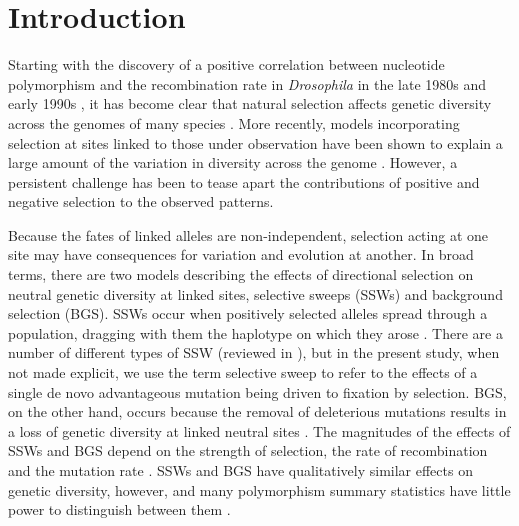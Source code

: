 \section{Introduction}
 
	Starting with the discovery of a positive correlation between nucleotide polymorphism and the recombination rate in \textit{Drosophila} in the late 1980s and early 1990s \citep{RN225, RN114}, it has become clear that natural selection affects genetic diversity across the genomes of many species \citep{RN117, RN154}. More recently, models incorporating selection at sites linked to those under observation have been shown to explain a large amount of the variation in diversity across the genome \citep{RN120, RN228, RN116, RN274}. However, a persistent challenge has been to tease apart the contributions of positive and negative selection to the observed patterns.

	Because the fates of linked alleles are non-independent, selection acting at one site may have consequences for variation and evolution at another. In broad terms, there are two models describing the effects of directional selection on neutral genetic diversity at linked sites, selective sweeps (SSWs) and background selection (BGS). SSWs occur when positively selected alleles spread through a population, dragging with them the haplotype on which they arose \citep{RN124,RN235}. There are a number of different types of SSW (reviewed in \citealt{RN352}), but in the present study, when not made explicit, we use the term selective sweep to refer to the effects of a single de novo advantageous mutation being driven to fixation by selection. BGS, on the other hand, occurs because the removal of deleterious mutations results in a loss of genetic diversity at linked neutral sites \citep{RN132, RN115}. The magnitudes of the effects of SSWs and BGS depend on the strength of selection, the rate of recombination and the mutation rate \citep{RN206, RN157, RN235}. SSWs and BGS have qualitatively similar effects on genetic diversity, however, and many polymorphism summary statistics have little power to distinguish between them \cite{RN339, RN115}. 

